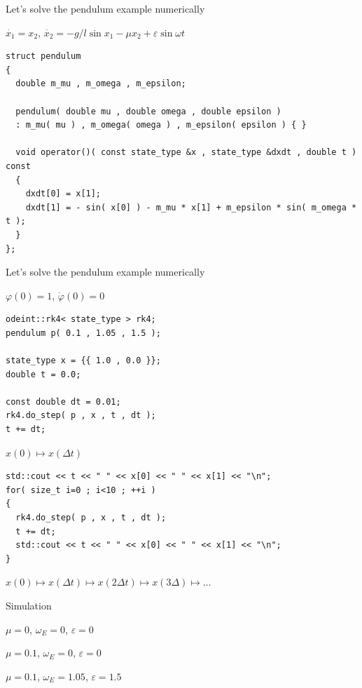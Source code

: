 \begin{frame}[fragile]

\centerline{ \Large Let's solve the pendulum example numerically}

$\dot{x_1} = x_2$, $\dot{x_2} = - g / l \sin x_1 - \mu x_2 + \varepsilon \sin \omega t$
\begin{lstlisting}
struct pendulum
{
  double m_mu , m_omega , m_epsilon;

  pendulum( double mu , double omega , double epsilon )
  : m_mu( mu ) , m_omega( omega ) , m_epsilon( epsilon ) { }

  void operator()( const state_type &x , state_type &dxdt , double t ) const
  {
    dxdt[0] = x[1];
    dxdt[1] = - sin( x[0] ) - m_mu * x[1] + m_epsilon * sin( m_omega * t );
  }
};
\end{lstlisting}

\end{frame}

\begin{frame}[fragile]
 \centerline{ \Large Let's solve the pendulum example numerically}

$\varphi(0) = 1$, $\dot{\varphi}(0) = 0$

\begin{lstlisting}
odeint::rk4< state_type > rk4;
pendulum p( 0.1 , 1.05 , 1.5 );

state_type x = {{ 1.0 , 0.0 }};
double t = 0.0;

const double dt = 0.01;
rk4.do_step( p , x , t , dt );
t += dt;
\end{lstlisting}

$x(0) \mapsto x(\Delta t)$

\begin{lstlisting}
std::cout << t << " " << x[0] << " " << x[1] << "\n";
for( size_t i=0 ; i<10 ; ++i )
{
  rk4.do_step( p , x , t , dt );
  t += dt;
  std::cout << t << " " << x[0] << " " << x[1] << "\n";
}
\end{lstlisting}

$x(0) \mapsto x(\Delta t) \mapsto x(2\Delta t) \mapsto x(3\Delta) \mapsto \dots$

\end{frame}


\begin{frame}[fragile]
 Simulation

 $\mu=0$, $\omega_E = 0$, $\varepsilon=0$

 $\mu=0.1$, $\omega_E = 0$, $\varepsilon=0$

 $\mu=0.1$, $\omega_E = 1.05$, $\varepsilon=1.5$
\end{frame}

